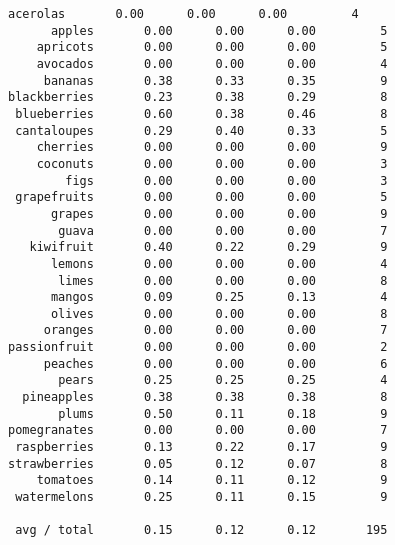 \documentclass[11pt]{article}
\begin{document}
\begin{Verbatim}[commandchars=\\\{\}]
    acerolas       0.00      0.00      0.00         4
      apples       0.00      0.00      0.00         5
    apricots       0.00      0.00      0.00         5
    avocados       0.00      0.00      0.00         4
     bananas       0.38      0.33      0.35         9
blackberries       0.23      0.38      0.29         8
 blueberries       0.60      0.38      0.46         8
 cantaloupes       0.29      0.40      0.33         5
    cherries       0.00      0.00      0.00         9
    coconuts       0.00      0.00      0.00         3
        figs       0.00      0.00      0.00         3
 grapefruits       0.00      0.00      0.00         5
      grapes       0.00      0.00      0.00         9
       guava       0.00      0.00      0.00         7
   kiwifruit       0.40      0.22      0.29         9
      lemons       0.00      0.00      0.00         4
       limes       0.00      0.00      0.00         8
      mangos       0.09      0.25      0.13         4
      olives       0.00      0.00      0.00         8
     oranges       0.00      0.00      0.00         7
passionfruit       0.00      0.00      0.00         2
     peaches       0.00      0.00      0.00         6
       pears       0.25      0.25      0.25         4
  pineapples       0.38      0.38      0.38         8
       plums       0.50      0.11      0.18         9
pomegranates       0.00      0.00      0.00         7
 raspberries       0.13      0.22      0.17         9
strawberries       0.05      0.12      0.07         8
    tomatoes       0.14      0.11      0.12         9
 watermelons       0.25      0.11      0.15         9

 avg / total       0.15      0.12      0.12       195


\end{Verbatim}
\end{document}
